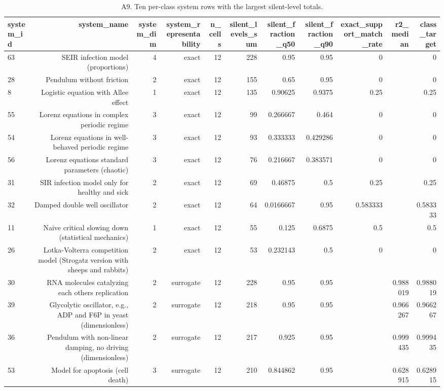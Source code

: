 \begin{table}[htbp]
\centering
\caption{A9. Ten per-class system rows with the largest silent-level totals.}
\begin{tabular}{lrrrrrrrrrr}
\toprule
system\_id & system\_name & system\_dim & system\_representability & n\_cells & silent\_levels\_sum & silent\_fraction\_q50 & silent\_fraction\_q90 & exact\_support\_match\_rate & r2\_median & class\_target \\
\midrule
63 & SEIR infection model (proportions) & 4 & exact & 12 & 228 & 0.95 & 0.95 & 0 &  & 0 \\
28 & Pendulum without friction & 2 & exact & 12 & 155 & 0.65 & 0.95 & 0 &  & 0 \\
8 & Logistic equation with Allee effect & 1 & exact & 12 & 135 & 0.90625 & 0.9375 & 0.25 &  & 0.25 \\
55 & Lorenz equations in complex periodic regime & 3 & exact & 12 & 99 & 0.266667 & 0.464 & 0 &  & 0 \\
54 & Lorenz equations in well-behaved periodic regime & 3 & exact & 12 & 93 & 0.333333 & 0.429286 & 0 &  & 0 \\
56 & Lorenz equations standard parameters (chaotic) & 3 & exact & 12 & 76 & 0.216667 & 0.383571 & 0 &  & 0 \\
31 & SIR infection model only for healthy and sick & 2 & exact & 12 & 69 & 0.46875 & 0.5 & 0.25 &  & 0.25 \\
32 & Damped double well oscillator & 2 & exact & 12 & 64 & 0.0166667 & 0.95 & 0.583333 &  & 0.583333 \\
11 & Naive critical slowing down (statistical mechanics) & 1 & exact & 12 & 55 & 0.125 & 0.6875 & 0.5 &  & 0.5 \\
26 & Lotka-Volterra competition model (Strogatz version with sheeps and rabbits) & 2 & exact & 12 & 53 & 0.232143 & 0.5 & 0 &  & 0 \\
30 & RNA molecules catalyzing each others replication & 2 & surrogate & 12 & 228 & 0.95 & 0.95 &  & 0.988019 & 0.988019 \\
39 & Glycolytic oscillator, e.g., ADP and F6P in yeast (dimensionless) & 2 & surrogate & 12 & 218 & 0.95 & 0.95 &  & 0.966267 & 0.966267 \\
36 & Pendulum with non-linear damping, no driving (dimensionless) & 2 & surrogate & 12 & 217 & 0.925 & 0.95 &  & 0.999435 & 0.999435 \\
53 & Model for apoptosis (cell death) & 3 & surrogate & 12 & 210 & 0.844862 & 0.95 &  & 0.628915 & 0.628915 \\

\end{tabular}
\end{table}
